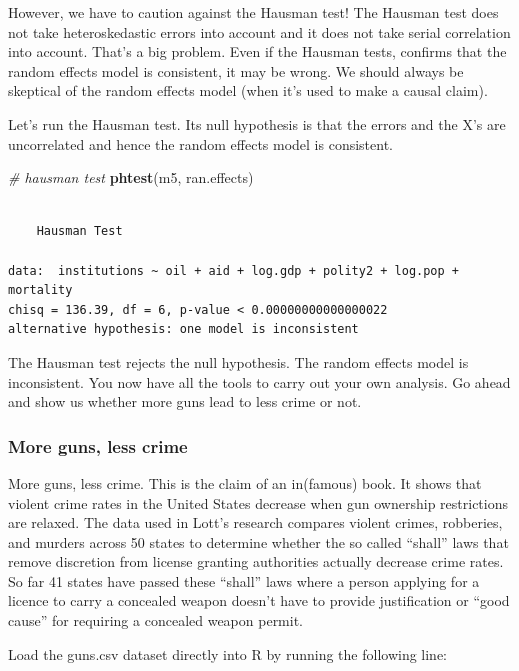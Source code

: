 \documentclass[]{article}
\newenvironment{Shaded}{\begin{snugshade}}{\end{snugshade}}
\newcommand{\KeywordTok}[1]{\textcolor[rgb]{0.13,0.29,0.53}{\textbf{#1}}}
\newcommand{\CommentTok}[1]{\textcolor[rgb]{0.56,0.35,0.01}{\textit{#1}}}
\newcommand{\NormalTok}[1]{#1}
\theoremstyle{definition}
\theoremstyle{definition}
\theoremstyle{definition}
\theoremstyle{remark}
\begin{document}
However, we have to caution against the Hausman test! The Hausman test
does not take heteroskedastic errors into account and it does not take
serial correlation into account. That's a big problem. Even if the
Hausman tests, confirms that the random effects model is consistent, it
may be wrong. We should always be skeptical of the random effects model
(when it's used to make a causal claim).

Let's run the Hausman test. Its null hypothesis is that the errors and
the X's are uncorrelated and hence the random effects model is
consistent.

\begin{Shaded}
\begin{Highlighting}[]
\CommentTok{# hausman test}
\KeywordTok{phtest}\NormalTok{(m5, ran.effects)}
\end{Highlighting}
\end{Shaded}

\begin{verbatim}

    Hausman Test

data:  institutions ~ oil + aid + log.gdp + polity2 + log.pop + mortality
chisq = 136.39, df = 6, p-value < 0.00000000000000022
alternative hypothesis: one model is inconsistent
\end{verbatim}

The Hausman test rejects the null hypothesis. The random effects model
is inconsistent. You now have all the tools to carry out your own
analysis. Go ahead and show us whether more guns lead to less crime or
not.

\subsubsection{More guns, less crime}\label{more-guns-less-crime}

More guns, less crime. This is the claim of an in(famous) book. It shows
that violent crime rates in the United States decrease when gun
ownership restrictions are relaxed. The data used in Lott's research
compares violent crimes, robberies, and murders across 50 states to
determine whether the so called ``shall'' laws that remove discretion
from license granting authorities actually decrease crime rates. So far
41 states have passed these ``shall'' laws where a person applying for a
licence to carry a concealed weapon doesn't have to provide
justification or ``good cause'' for requiring a concealed weapon permit.

Load the guns.csv dataset directly into R by running the following line:
\end{document}
